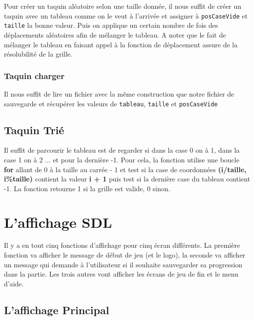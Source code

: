 \documentclass[a4paper]{article}
\begin{document}
Pour créer un taquin aléatoire selon une taille donnée, il nous suffit de créer
un taquin avec un tableau comme on le veut à l'arrivée et assigner à
\texttt{posCaseVide} et \texttt{taille} la bonne valeur. Puis on applique un
certain nombre de fois des déplacements aléatoires afin de mélanger le
tableau. A noter que le fait de mélanger le tableau en faisant appel à la
fonction de déplacement assure de la résolubilité de la grille.

\subsubsection{Taquin charger}
\label{subsubsec:charger}

Il nous suffit de lire un fichier avec la même construction que notre fichier de
sauvegarde et récupérer les valeurs de \texttt{tableau}, \texttt{taille} et
\texttt{posCaseVide}

\subsection{Taquin Trié}
\label{subsec:taquinTrié}

Il suffit de parcourir le tableau est de regarder si dans la case 0 on à 1, dans
la case 1 on à 2 ... et pour la dernière -1. Pour cela, la fonction utilise une
boucle \textbf{for} allant de 0 à la taille au carrée - 1 et test si la case de
coordonnées \textbf{(i/taille, i\%taille)} contient la valeur \textbf{i + 1}
puis test si la dernière case du tableau contient -1. La fonction retourne 1 si
la grille est valide, 0 sinon.




\section{L'affichage SDL}

Il y a en tout cinq fonctions d'affichage pour cinq écran différents. La
première fonction va afficher le message de début de jeu (et le logo), la
seconde va afficher un message qui demande à l’utilisateur si il souhaite
sauvegarder sa progression dans la partie. Les trois autres vont afficher les
écrans de jeu de fin et le menu d'aide.

\subsection{L'affichage Principal}
\end{document}
